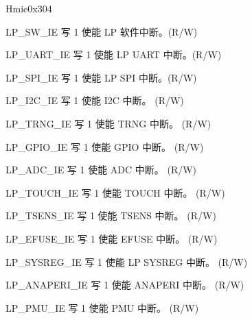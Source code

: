 \begin{register}{H}{mie}{0x304}\label{regdesc:LPMIE}
%
%
%
%
%
%
%
%
%
%
%
%
%
%
%
%
%
%
%
%
%
%
%
\regnewline%
\begin{regdesc}\begin{reglist}
\label{fielddesc:LPMIELPSWIE}\item [LP\_SW\_IE] 写 1 使能 LP 软件中断。(R/W)
\label{fielddesc:LPMILPUARTIE}\item [LP\_UART\_IE] 写 1 使能 LP UART 中断。(R/W)
\label{fielddesc:LPMIELPSPIIE}\item [LP\_SPI\_IE] 写 1 使能 LP SPI 中断。(R/W)
\label{fielddesc:LPMIEI2CIE}\item [LP\_I2C\_IE] 写 1 使能 I2C 中断。 (R/W)
\label{fielddesc:LPMIETRNGIE}\item [LP\_TRNG\_IE] 写 1 使能 TRNG 中断。 (R/W)
\label{fielddesc:LPMIEGPIOIE}\item [LP\_GPIO\_IE] 写 1 使能 GPIO 中断。 (R/W)
\label{fielddesc:LPMIEADCIE}\item [LP\_ADC\_IE] 写 1 使能 ADC 中断。 (R/W)
\label{fielddesc:LPMIETOUCHIE}\item [LP\_TOUCH\_IE] 写 1 使能 TOUCH 中断。 (R/W)
\label{fielddesc:LPMIETSENSIE}\item [LP\_TSENS\_IE] 写 1 使能 TSENS 中断。 (R/W)
\label{fielddesc:LPMIEEFUSEIE}\item [LP\_EFUSE\_IE] 写 1 使能 EFUSE 中断。 (R/W)
\label{fielddesc:LPMIESYSREGIE}\item [LP\_SYSREG\_IE] 写 1 使能 LP SYSREG 中断。 (R/W)
\label{fielddesc:LPMIEANAPERIIE}\item [LP\_ANAPERI\_IE] 写 1 使能 ANAPERI 中断。 (R/W)
\label{fielddesc:LPMIEPMUIE}\item [LP\_PMU\_IE] 写 1 使能 PMU 中断。 (R/W)

\end{reglist}
\end{regdesc}
\end{register}
